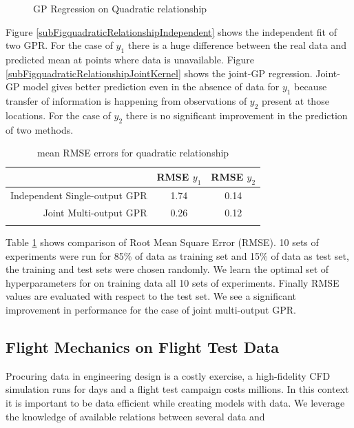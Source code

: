 \begin{figure}[!t]
  \caption{GP Regression on Quadratic relationship}
\end{figure}\label{fig:GPMOQuadraticRelationship}


Figure \ref{subFigquadraticRelationshipIndependent} shows the independent fit of two GPR. For the case of \(y_{1}\) there is a huge difference between the real data and predicted mean at points where data is unavailable. Figure \ref{subFigquadraticRelationshipJointKernel} shows the joint-GP regression. Joint-GP model gives better prediction even in the absence of data for \(y_{1}\) because transfer of information is happening from observations of \(y_{2}\) present at those locations. For the case of \(y_{2}\) there is no significant improvement in the prediction of two methods. 

\begin{table}
\caption{mean RMSE errors for quadratic relationship}
\centering
\label{t:observed_psrs}
\begin{tabular}{rcc}
\noalign{\smallskip} \hline \hline \noalign{\smallskip}
 & RMSE \(y_{1}\) & RMSE \(y_{2}\) \\
\hline
Independent Single-output GPR & 1.74 & 0.14 \\
Joint Multi-output GPR & 0.26 & 0.12 \\
\noalign{\smallskip} \hline \noalign{\smallskip}
\end{tabular}
\label{table:rmseY1Y2}
\end{table}

Table \ref{table:rmseY1Y2} shows comparison of Root Mean Square Error (RMSE). 10 sets of experiments were run for 85\% of data as training set and 15\% of data as test set, the training and test sets were chosen randomly. We learn the optimal set of hyperparameters for on training data all 10 sets of experiments. Finally RMSE values are evaluated with respect to the test set. We see a significant improvement in performance for the case of joint multi-output GPR. 

\subsection{Flight Mechanics on Flight Test Data}\label{sub:experimentsFlightLoadsData}
Procuring data in engineering design is a costly exercise, a high-fidelity CFD simulation runs for days and a flight test campaign costs millions. In this context it is important to be data efficient while creating models with data. We leverage the knowledge of available relations between several data and 


